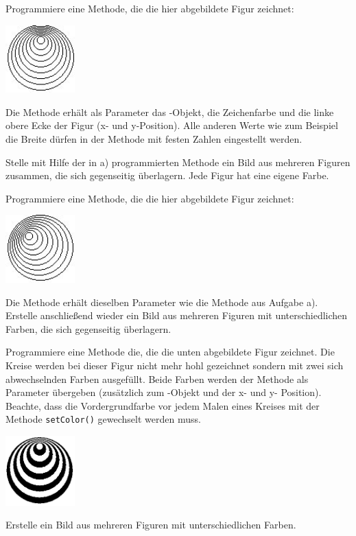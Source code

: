Programmiere eine Methode, die die hier abgebildete Figur zeichnet: 

\begin{center}
\includegraphics[width=0.2\textwidth]{./inf/SEKII/08_Java_Eigene_Programme_mit_HJFrame/Aufgabe6-1.png}
\end{center}

\begin{compactenum}[a)]
\item Die Methode erhält als Parameter das -Objekt, die
Zeichenfarbe und die linke obere Ecke der Figur (x- und y-Position). Alle anderen Werte wie
zum Beispiel die Breite dürfen in der Methode mit festen Zahlen eingestellt werden.
\item Stelle mit Hilfe der in a) programmierten Methode ein Bild aus mehreren
Figuren zusammen, die sich gegenseitig überlagern. Jede Figur hat eine eigene Farbe.
\item Programmiere eine Methode, die die hier abgebildete Figur zeichnet:

\begin{center}
\includegraphics[width=0.2\textwidth]{./inf/SEKII/08_Java_Eigene_Programme_mit_HJFrame/Aufgabe6-2.png}
\end{center}

Die Methode erhält dieselben Parameter wie die Methode aus Aufgabe a). Erstelle
anschließend wieder ein Bild aus mehreren Figuren mit unterschiedlichen Farben,
die sich gegenseitig überlagern.
\item Programmiere eine Methode die, die die unten abgebildete Figur zeichnet.
Die Kreise werden bei dieser Figur nicht mehr hohl gezeichnet sondern mit zwei
sich abwechselnden Farben ausgefüllt. Beide Farben werden der Methode als
Parameter übergeben (zusätzlich zum -Objekt und der x- und y-
Position). Beachte, dass die Vordergrundfarbe vor jedem Malen eines Kreises mit
der Methode \lstinline|setColor()| gewechselt werden muss.

\begin{center}
\includegraphics[width=0.2\textwidth]{./inf/SEKII/08_Java_Eigene_Programme_mit_HJFrame/Aufgabe6-3.png}
\end{center}

Erstelle ein Bild aus mehreren Figuren mit unterschiedlichen Farben.
\end{compactenum}

